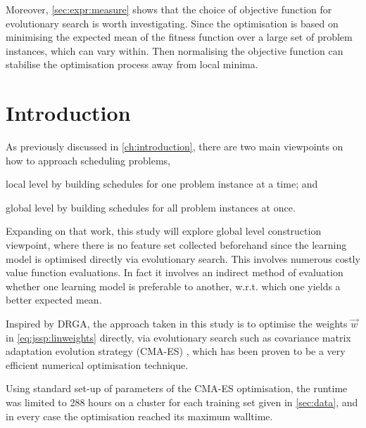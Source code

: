 Moreover, \cref{sec:expr:measure} shows that the choice of objective function  for evolutionary search is worth investigating. Since the optimisation is based on minimising the expected mean of the fitness function over a large set of problem instances, which can vary within. Then normalising the objective function can stabilise the optimisation process away from local minima. 

\section{Introduction}
As previously discussed in \cref{ch:introduction}, there are two main viewpoints on how to approach scheduling problems,
\begin{inparaenum} 
\item local level by building schedules for one problem instance at a time;
and \item global level by building schedules for all problem instances at once.
\end{inparaenum}
 Expanding on that  work, this study will explore global level construction viewpoint, where there is no feature set collected beforehand since the learning model is optimised directly via evolutionary search. This involves numerous costly value function evaluations. In fact it involves an indirect method of evaluation whether one learning model is preferable to another, w.r.t. which one yields a better expected mean. 



Inspired by DRGA, the approach taken in this study is to optimise the weights $\vec{w}$ in \cref{eq:jssp:linweights} directly, via evolutionary search such as covariance matrix adaptation evolution strategy (CMA-ES) \cite{Hansen01}, which has been proven to be a very efficient numerical optimisation technique. 

Using standard set-up of parameters of the CMA-ES optimisation, the runtime was limited to 288 hours on a cluster for each training set given in \cref{sec:data}, and in every case the optimisation reached its maximum walltime.

